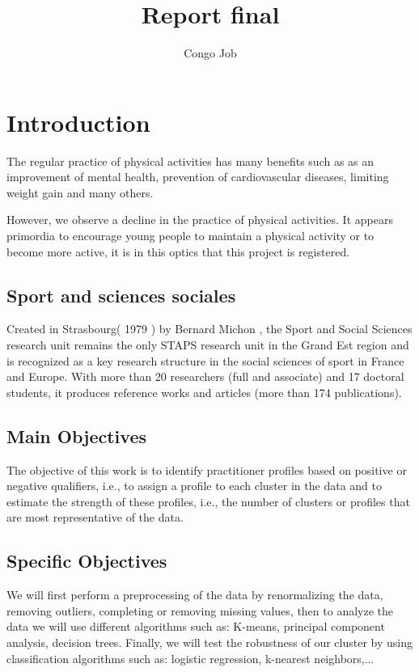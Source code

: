 \documentclass[12pt]{article}
\title{Report final}
\author{Congo Job}
\begin{document}
    \maketitle

\tableofcontents

\section{Introduction}
The regular practice of physical activities has many benefits such as 
as an improvement of mental health, prevention of cardiovascular diseases, limiting weight gain and many others. 

However, we observe a decline in the practice of physical activities.
It appears primordia to encourage young people to maintain a physical activity or to become more active, it is in this optics that this project is registered. 



\subsection{Sport and sciences sociales}

Created in Strasbourg( 1979 ) by Bernard Michon , the Sport and Social Sciences research unit
remains the only STAPS research unit in the Grand Est region and is recognized as a key research structure in the social sciences of sport in France and Europe.
With more than 20 researchers (full and associate) and 17 doctoral students, it produces reference works and articles (more than 174 publications).




\subsection{Main Objectives}

The objective of this work is to identify practitioner profiles based on positive or negative qualifiers, i.e., to assign a profile to each cluster in the data and to estimate the strength of these profiles, i.e., the number of clusters or profiles that are most representative of the data.


\subsection{Specific Objectives}
We will first perform a preprocessing of the data by renormalizing the data, removing outliers, completing or removing missing values, then to analyze the data we will use different algorithms such as: K-means, principal component analysis, decision trees. Finally, we will test the robustness of our cluster by using classification algorithms such as: logistic regression, k-nearest neighbors,...
\end{document}
